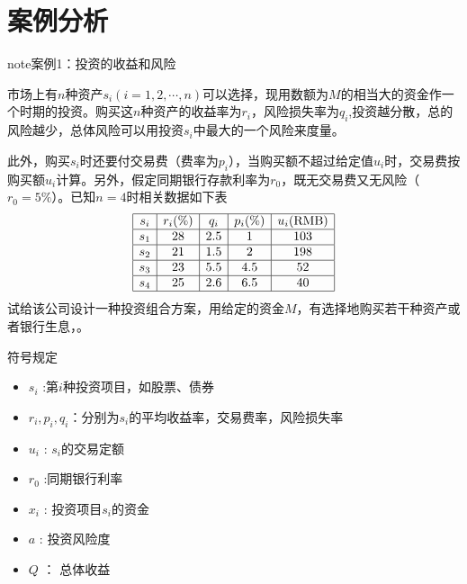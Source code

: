 \documentclass[letterpaper,10pt,english]{sphinxmanual}
\begin{document}
\section{案例分析}
\label{\detokenize{docs/LP:id13}}
\begin{sphinxadmonition}{note}{案例1：投资的收益和风险}

市场上有\(n\)种资产\(s_i(i = 1,2,\cdots,n)\)可以选择，现用数额为\(M\)的相当大的资金作一个时期的投资。购买这\(n\)种资产的收益率为\(r_i\)，风险损失率为\(q_i\),投资越分散，总的风险越少，总体风险可以用投资\(s_i\)中最大的一个风险来度量。

此外，购买\(s_i\)时还要付交易费（费率为\(p_i\)），当购买额不超过给定值\(u_i\)时，交易费按购买额\(u_i\)计算。另外，假定同期银行存款利率为\(r_0\)，既无交易费又无风险（\(r_0 = 5\%\)）。已知\(n=4\)时相关数据如下表
\begin{equation*}
\begin{split}
\begin{array}{|c|c|c|c|c|}\hline s_{i} & {r_{i}(\%)} & {q_{i}} & {p_{i}(\%)} & {u_{i}(\text{RMB})} \\ 
\hline s_{1} & {28} & {2.5} & {1} & {103} \\ 
\hline s_{2} & {21} & {1.5} & {2} & {198} \\ 
\hline s_{3} & {23} & {5.5} & {4.5} & {52} \\ 
\hline s_{4} & {25} & {2.6} & {6.5} & {40} \\ 
\hline\end{array}
\end{split}
\end{equation*}
试给该公司设计一种投资组合方案，用给定的资金\(M\)，有选择地购买若干种资产或者银行生息，。
\end{sphinxadmonition}

符号规定
\begin{itemize}
\item {} 
\(s_i\)  :第\(i\)种投资项目，如股票、债券

\item {} 
\(r_i,p_i,q_i\)：分别为\(s_i\)的平均收益率，交易费率，风险损失率

\item {} 
\(u_i\) : \(s_i\)的交易定额

\item {} 
\(r_0\) :同期银行利率

\item {} 
\(x_i\) : 投资项目\(s_i\)的资金

\item {} 
\(a\) : 投资风险度

\item {} 
\(Q\) ： 总体收益

\end{itemize}
\end{document}
